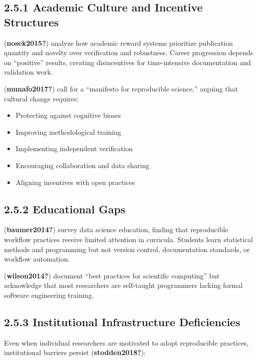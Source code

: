 \documentclass[
  oneside,
  open=any]{scrbook}
\providecommand{\tightlist}{%
  \setlength{\itemsep}{0pt}\setlength{\parskip}{0pt}}\usepackage{longtable,booktabs,array}
\begin{document}
\subsection{2.5.1 Academic Culture and Incentive
Structures}\label{academic-culture-and-incentive-structures}

(\textbf{nosek2015?}) analyze how academic reward systems prioritize
publication quantity and novelty over verification and robustness.
Career progression depends on ``positive'' results, creating
disincentives for time-intensive documentation and validation work.

(\textbf{munafo2017?}) call for a ``manifesto for reproducible
science,'' arguing that cultural change requires:

\begin{itemize}
\tightlist
\item
  Protecting against cognitive biases
\item
  Improving methodological training
\item
  Implementing independent verification
\item
  Encouraging collaboration and data sharing
\item
  Aligning incentives with open practices
\end{itemize}

\subsection{2.5.2 Educational Gaps}\label{educational-gaps}

(\textbf{baumer2014?}) survey data science education, finding that
reproducible workflow practices receive limited attention in curricula.
Students learn statistical methods and programming but not version
control, documentation standards, or workflow automation.

(\textbf{wilson2014?}) document ``best practices for scientific
computing'' but acknowledge that most researchers are self-taught
programmers lacking formal software engineering training.

\subsection{2.5.3 Institutional Infrastructure
Deficiencies}\label{institutional-infrastructure-deficiencies}

Even when individual researchers are motivated to adopt reproducible
practices, institutional barriers persist (\textbf{stodden2018?}):
\end{document}

